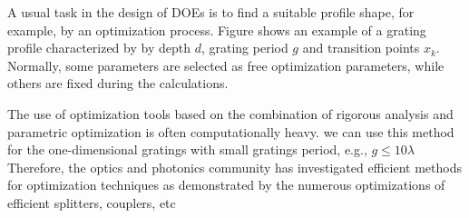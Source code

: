 A usual task in the design of DOEs is to find a suitable profile shape, for example, by an optimization process. 
Figure shows an example of a grating profile characterized by by depth $d$, grating period $g$ and transition points $x_{k}$. Normally, some parameters are selected as free optimization parameters, while others are fixed during the calculations.

The use of optimization tools based on the combination of rigorous analysis and parametric optimization is often computationally heavy. we can use this method for the one-dimensional gratings with small gratings period, e.g., $g \leq 10\lambda$ %
Therefore, the optics and photonics community has investigated efficient methods for optimization techniques as demonstrated by the numerous optimizations of efficient splitters, couplers, etc%

